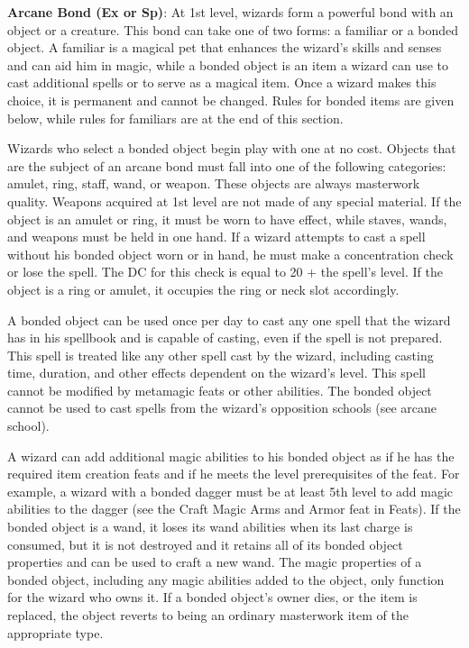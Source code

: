 \textbf{Arcane Bond (Ex or Sp)}: At 1st level, wizards form a powerful bond with an object or a creature. This bond can take one of two forms: a familiar or a bonded object. A familiar is a magical pet that enhances the wizard's skills and senses and can aid him in magic, while a bonded object is an item a wizard can use to cast additional spells or to serve as a magical item. Once a wizard makes this choice, it is permanent and cannot be changed. Rules for bonded items are given below, while rules for familiars are at the end of this section.
				
Wizards who select a bonded object begin play with one at no cost. Objects that are the subject of an arcane bond must fall into one of the following categories: amulet, ring, staff, wand, or weapon. These objects are always masterwork quality. Weapons acquired at 1st level are not made of any special material. If the object is an amulet or ring, it must be worn to have effect, while staves, wands, and weapons must be held in one hand. If a wizard attempts to cast a spell without his bonded object worn or in hand, he must make a concentration check or lose the spell. The DC for this check is equal to 20 + the spell's level. If the object is a ring or amulet, it occupies the ring or neck slot accordingly.
				
A bonded object can be used once per day to cast any one spell that the wizard has in his spellbook and is capable of casting, even if the spell is not prepared. This spell is treated like any other spell cast by the wizard, including casting time, duration, and other effects dependent on the wizard's level. This spell cannot be modified by metamagic feats or other abilities. The bonded object cannot be used to cast spells from the wizard's opposition schools (see arcane school).
				
A wizard can add additional magic abilities to his bonded object as if he has the required item creation feats and if he meets the level prerequisites of the feat. For example, a wizard with a bonded dagger must be at least 5th level to add magic abilities to the dagger (see the Craft Magic Arms and Armor feat in Feats). If the bonded object is a wand, it loses its wand abilities when its last charge is consumed, but it is not destroyed and it retains all of its bonded object properties and can be used to craft a new wand. The magic properties of a bonded object, including any magic abilities added to the object, only function for the wizard who owns it. If a bonded object's owner dies, or the item is replaced, the object reverts to being an ordinary masterwork item of the appropriate type.
				
